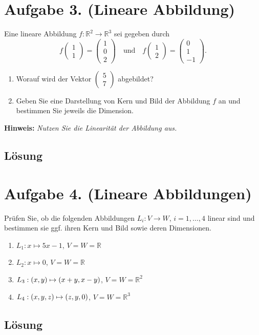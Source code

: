 \documentclass[german,12pt]{homework}
\newcommand{\RR}{\mathbb{R}}
\DeclarePairedDelimiter{\enbrace}{(}{)}
\begin{document}
    \section*{Aufgabe 3. (Lineare Abbildung)}

    \begin{problem}
        Eine lineare Abbildung \(f: \RR^2 \to \RR^3\) sei gegeben durch
        \[f\begin{pmatrix}1\\1\end{pmatrix} = \begin{pmatrix}1\\0\\2
        \end{pmatrix} \quad \text{und} \quad f\begin{pmatrix}1\\2\end{pmatrix}
        = \begin{pmatrix}0\\1\\-1\end{pmatrix}.\]
        \begin{enumerate}
            \item Worauf wird der Vektor \(\begin{pmatrix}5\\7\end{pmatrix}\)
            abgebildet?
            \item Geben Sie eine Darstellung von Kern und Bild der Abbildung
            \(f\) an und bestimmen Sie jeweils die Dimension.
        \end{enumerate}
        \textbf{Hinweis:} \quad \emph{Nutzen Sie die Linearität der Abbildung
        aus.}
    \end{problem}

    \subsection*{Lösung}

    \section*{Aufgabe 4. (Lineare Abbildungen)}

    \begin{problem}
        Prüfen Sie, ob die folgenden Abbildungen \(L_i: V \to W\), \(i = 1,
        \ldots, 4\) linear sind und bestimmen sie ggf. ihren Kern und Bild
        sowie deren Dimensionen.
        \begin{enumerate}
            \item \(L_1: x \mapsto 5x - 1\), \(V = W = \RR\)
            \item \(L_2: x \mapsto 0\), \(V = W = \RR\)
            \item \(L_3: \enbrace*{x, y} \mapsto \enbrace*{x + y, x - y}\), \(V
            = W = \RR^2\)
            \item \(L_4: \enbrace*{x, y, z} \mapsto \enbrace*{z, y, 0}\), \(V =
            W = \RR^3\)
        \end{enumerate}
    \end{problem}

    \subsection*{Lösung}
\end{document}
